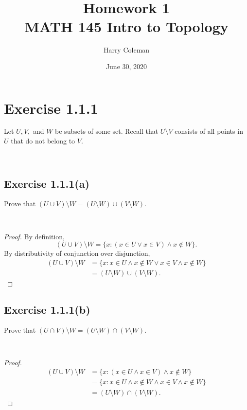 \documentclass[12pt]{article}
\newenvironment{problem}
    {\begin{lrbox}{\mybox}\begin{minipage}{\textwidth-10pt}}
    {\end{minipage}\end{lrbox}\framebox[6.5in]{\usebox{\mybox}}\\}
\begin{document}
 
\title{Homework 1\\
    \large MATH 145 Intro to Topology
}
\author{Harry Coleman}
\date{June 30, 2020}
\maketitle

\section*{Exercise 1.1.1}
\begin{problem}
    Let $U,V,$ and $W$ be subsets of some set. Recall that $U\setminus V$ consists of all points in $U$ that do not belong to $V$.
\end{problem}

\subsection*{Exercise 1.1.1(a)}
\begin{problem}
    Prove that $(U \cup V)\setminus W = (U\setminus W) \cup (V\setminus W)$.
\end{problem}

\begin{proof}
    By definition,
    \[(U\cup V)\setminus W = \{x : (x\in U \lor x\in V) \land x\notin W\}.\]
    By distributivity of conjunction over disjunction,
    \begin{align*}
        (U\cup V)\setminus W
            &= \{x : x\in U \land x\notin W\lor x\in V \land x\notin W\} \\
            &= (U\setminus W) \cup (V\setminus W).
    \end{align*}
    
\end{proof}

\subsection*{Exercise 1.1.1(b)}
\begin{problem}
    Prove that $(U \cap V)\setminus W = (U\setminus W) \cap (V\setminus W)$.
\end{problem}

\begin{proof}
    \begin{align*}
        (U\cup V)\setminus W
            &= \{x : (x\in U \land x\in V) \land x\notin W\} \\
            &= \{x : x\in U \land x\notin W\land x\in V \land x\notin W\} \\
            &= (U\setminus W) \cap (V\setminus W).
    \end{align*}
    
\end{proof}
\end{document}
